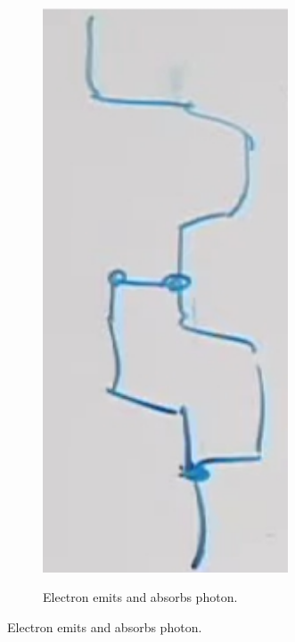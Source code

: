 \documentclass[]{article}
\begin{document}
\begin{figure}[H]
\begin{subfigure}{0.4\textwidth}
		\includegraphics[width=0.8\textwidth]{path-integral-cubic-split}
	\end{subfigure}
	\begin{subfigure}{0.4\textwidth}
		\caption{Electron emits and absorbs photon.}\label{fig:path:integral:cubic:split1}

\end{subfigure}
\end{figure}
\end{document}
